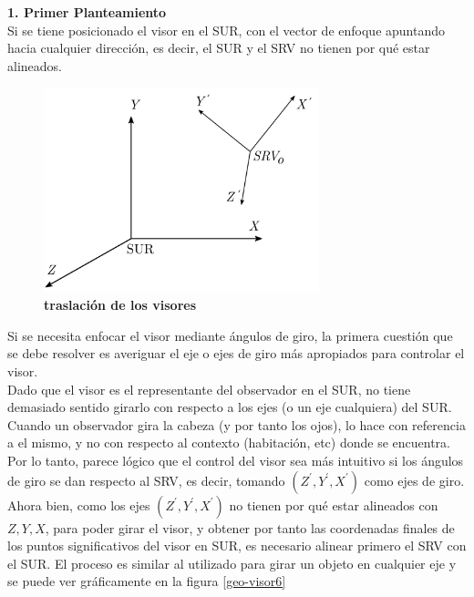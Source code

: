 \textbf{1. Primer Planteamiento}\\
Si se tiene posicionado el visor en el SUR, con el vector de enfoque apuntando hacia cualquier dirección, es decir, el SUR y el SRV no tienen por qué estar alineados.

\begin{figure}[h]
\includegraphics[width=8cm]{Img/GEO/geo-visor-5.png}
\centering
    \caption{\footnotesize{\textbf{traslación de los visores}}}
    \label{geo-visor5}
\end{figure}

Si se necesita enfocar el visor mediante ángulos de giro, la primera cuestión que se debe resolver es averiguar el eje o ejes de giro más apropiados para controlar el visor.\\
Dado que el visor es el representante del observador en el SUR, no tiene demasiado sentido girarlo con respecto a los ejes (o un eje cualquiera) del SUR. Cuando un observador gira la cabeza (y por tanto los ojos), lo hace con referencia a el mismo, y no con respecto al contexto (habitación, etc) donde se encuentra. Por lo tanto, parece lógico que el control del visor sea más intuitivo si los ángulos de giro se dan respecto al SRV, es decir, tomando $(Z^{\prime}, Y^{\prime}, X^{\prime})$ como ejes de giro.\\
Ahora bien, como los ejes $(Z^{\prime}, Y^{\prime}, X^{\prime})$ no tienen por qué estar alineados con $Z, Y, X$, para poder girar el visor, y obtener por tanto las coordenadas finales de los puntos significativos del visor en SUR, es necesario alinear primero el SRV con el SUR. El proceso es similar al utilizado para girar un objeto en cualquier eje y se puede ver gráficamente en la figura \ref{geo-visor6}

